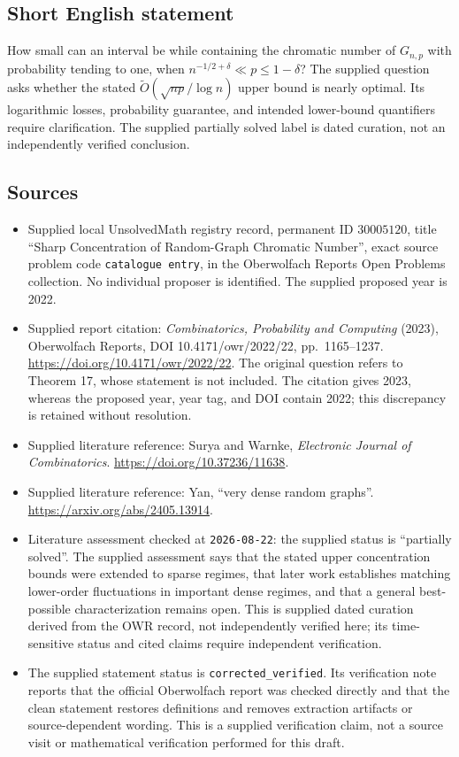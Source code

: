 \documentclass[11pt]{article}
\begin{document}
\subsection{Short English statement}
How small can an interval be while containing the chromatic number of \(G_{n,p}\) with probability tending to one, when \(n^{-1/2+\delta}\ll p\leq 1-\delta\)? The supplied question asks whether the stated \(\widetilde O(\sqrt{np}/\log n)\) upper bound is nearly optimal. Its logarithmic losses, probability guarantee, and intended lower-bound quantifiers require clarification. The supplied partially solved label is dated curation, not an independently verified conclusion.
\subsection{Sources}
\begin{itemize}
\item Supplied local UnsolvedMath registry record, permanent ID \(30005120\), title ``Sharp Concentration of Random-Graph Chromatic Number'', exact source problem code \texttt{catalogue entry}, in the Oberwolfach Reports Open Problems collection. No individual proposer is identified. The supplied proposed year is 2022.
\item Supplied report citation: \emph{Combinatorics, Probability and Computing} (2023), Oberwolfach Reports, DOI 10.4171/owr/2022/22, pp.\ 1165--1237. \url{https://doi.org/10.4171/owr/2022/22}. The original question refers to Theorem 17, whose statement is not included. The citation gives 2023, whereas the proposed year, year tag, and DOI contain 2022; this discrepancy is retained without resolution.
\item Supplied literature reference: Surya and Warnke, \emph{Electronic Journal of Combinatorics}. \url{https://doi.org/10.37236/11638}.
\item Supplied literature reference: Yan, ``very dense random graphs''. \url{https://arxiv.org/abs/2405.13914}.
\item Literature assessment checked at \texttt{2026-08-22}: the supplied status is ``partially solved''. The supplied assessment says that the stated upper concentration bounds were extended to sparse regimes, that later work establishes matching lower-order fluctuations in important dense regimes, and that a general best-possible characterization remains open. This is supplied dated curation derived from the OWR record, not independently verified here; its time-sensitive status and cited claims require independent verification.
\item The supplied statement status is \texttt{corrected\_verified}. Its verification note reports that the official Oberwolfach report was checked directly and that the clean statement restores definitions and removes extraction artifacts or source-dependent wording. This is a supplied verification claim, not a source visit or mathematical verification performed for this draft.
\end{itemize}
\end{document}
